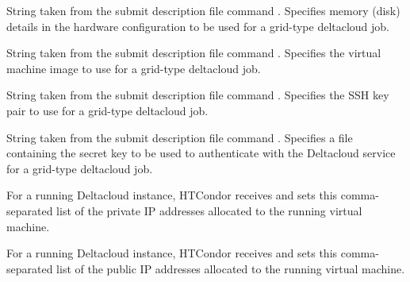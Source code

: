 \begin{description}
\item[\AdAttr{DeltacloudHardwareProfileStorage}:] 
String taken from the submit description file command
. Specifies memory (disk)
details in the hardware configuration to be used for a grid-type
deltacloud job.

\item[\AdAttr{DeltacloudImageId}:] 
String taken from the submit description file command
.
Specifies the virtual machine image to use for a grid-type deltacloud
job.

\item[\AdAttr{DeltacloudKeyname}:] 
String taken from the submit description file command
.
Specifies the SSH key pair to use for a grid-type deltacloud job.

\item[\AdAttr{DeltacloudPasswordFile}:] 
String taken from the submit description file command
.
Specifies a file containing the secret key to be used to authenticate
with the Deltacloud service for a grid-type deltacloud job.

\item[\AdAttr{DeltacloudPrivateNetworkAddresses}:] 
For a running Deltacloud instance,
HTCondor receives and sets this comma-separated list of the private IP addresses
allocated to the running virtual machine.

\item[\AdAttr{DeltacloudPublicNetworkAddresses}:] 
For a running Deltacloud instance,
HTCondor receives and sets this comma-separated list of the public IP addresses
allocated to the running virtual machine.


\end{description}
